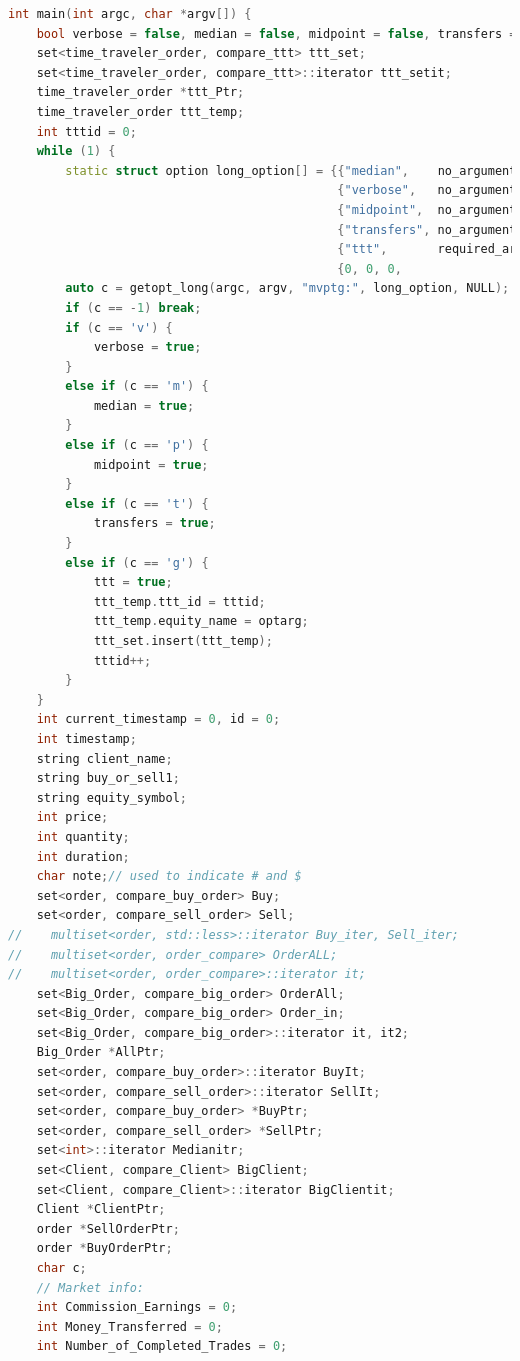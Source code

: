\documentclass{article}
\begin{document}
\begin{lstlisting}[language=C++]
int main(int argc, char *argv[]) {
    bool verbose = false, median = false, midpoint = false, transfers = false, ttt = false;
    set<time_traveler_order, compare_ttt> ttt_set;
    set<time_traveler_order, compare_ttt>::iterator ttt_setit;
    time_traveler_order *ttt_Ptr;
    time_traveler_order ttt_temp;
    int tttid = 0;
    while (1) {
        static struct option long_option[] = {{"median",    no_argument,       NULL, 'm'},
                                              {"verbose",   no_argument,       NULL, 'v'},
                                              {"midpoint",  no_argument,       NULL, 'p'},
                                              {"transfers", no_argument,       NULL, 't'},
                                              {"ttt",       required_argument, NULL, 'g'},
                                              {0, 0, 0,                              0}};
        auto c = getopt_long(argc, argv, "mvptg:", long_option, NULL);
        if (c == -1) break;
        if (c == 'v') {
            verbose = true;
        }
        else if (c == 'm') {
            median = true;
        }
        else if (c == 'p') {
            midpoint = true;
        }
        else if (c == 't') {
            transfers = true;
        }
        else if (c == 'g') {
            ttt = true;
            ttt_temp.ttt_id = tttid;
            ttt_temp.equity_name = optarg;
            ttt_set.insert(ttt_temp);
            tttid++;
        }
    }
    int current_timestamp = 0, id = 0;
    int timestamp;
    string client_name;
    string buy_or_sell1;
    string equity_symbol;
    int price;
    int quantity;
    int duration;
    char note;// used to indicate # and $
    set<order, compare_buy_order> Buy;
    set<order, compare_sell_order> Sell;
//    multiset<order, std::less>::iterator Buy_iter, Sell_iter;
//    multiset<order, order_compare> OrderALL;
//    multiset<order, order_compare>::iterator it;
    set<Big_Order, compare_big_order> OrderAll;
    set<Big_Order, compare_big_order> Order_in;
    set<Big_Order, compare_big_order>::iterator it, it2;
    Big_Order *AllPtr;
    set<order, compare_buy_order>::iterator BuyIt;
    set<order, compare_sell_order>::iterator SellIt;
    set<order, compare_buy_order> *BuyPtr;
    set<order, compare_sell_order> *SellPtr;
    set<int>::iterator Medianitr;
    set<Client, compare_Client> BigClient;
    set<Client, compare_Client>::iterator BigClientit;
    Client *ClientPtr;
    order *SellOrderPtr;
    order *BuyOrderPtr;
    char c;
    // Market info:
    int Commission_Earnings = 0;
    int Money_Transferred = 0;
    int Number_of_Completed_Trades = 0;

\end{lstlisting}
\end{document}
